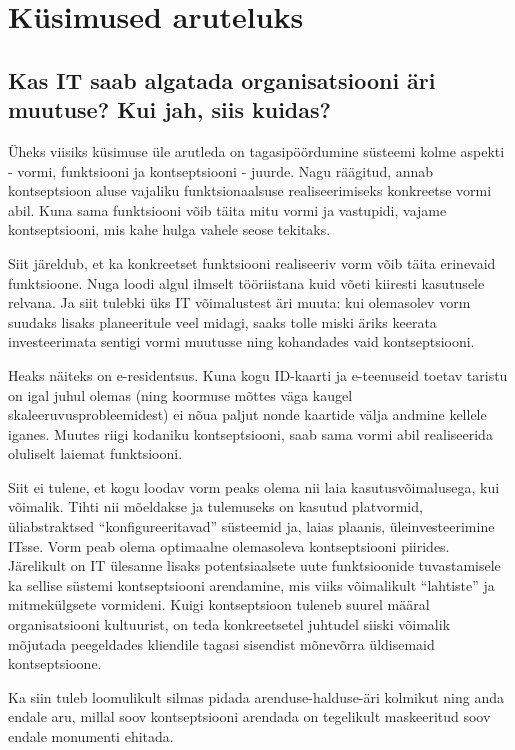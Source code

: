 \documentclass{tufte-book}
\begin{document}
\section{Küsimused aruteluks}
\subsection{Kas IT saab algatada organisatsiooni äri muutuse? Kui jah, siis kuidas?}
Üheks viisiks küsimuse üle arutleda on tagasipöördumine süsteemi kolme aspekti - vormi, funktsiooni ja kontseptsiooni - juurde. Nagu räägitud, annab kontseptsioon aluse vajaliku funktsionaalsuse realiseerimiseks konkreetse vormi abil. Kuna sama funktsiooni võib täita mitu vormi ja vastupidi, vajame kontseptsiooni, mis kahe hulga vahele seose tekitaks. 

Siit järeldub, et ka konkreetset funktsiooni realiseeriv vorm võib täita erinevaid funktsioone. Nuga loodi algul ilmselt tööriistana kuid võeti kiiresti kasutusele relvana. Ja siit tulebki üks IT võimalustest äri muuta: kui olemasolev vorm suudaks lisaks planeeritule veel midagi, saaks tolle miski äriks keerata investeerimata sentigi vormi muutusse ning kohandades vaid kontseptsiooni. 

Heaks näiteks on e-residentsus. Kuna kogu ID-kaarti ja e-teenuseid toetav taristu on igal juhul olemas (ning koormuse mõttes väga kaugel skaleeruvusprobleemidest) ei nõua paljut nonde kaartide välja andmine kellele iganes. Muutes riigi kodaniku kontseptsiooni, saab sama vormi abil realiseerida oluliselt laiemat funktsiooni. 

Siit ei tulene, et kogu loodav vorm peaks olema nii laia kasutusvõimalusega, kui võimalik. Tihti nii mõeldakse ja tulemuseks on kasutud platvormid, üliabstraktsed \enquote{konfigureeritavad} süsteemid ja, laias plaanis, üleinvesteerimine ITsse. Vorm peab olema optimaalne olemasoleva kontseptsiooni piirides. Järelikult on IT ülesanne lisaks potentsiaalsete uute funktsioonide tuvastamisele ka sellise süstemi kontseptsiooni arendamine, mis viiks võimalikult \enquote{lahtiste} ja mitmekülgsete vormideni. Kuigi kontseptsioon tuleneb suurel määral organisatsiooni kultuurist, on teda konkreetsetel juhtudel siiski võimalik mõjutada peegeldades kliendile tagasi sisendist mõnevõrra üldisemaid kontseptsioone. 

Ka siin tuleb loomulikult silmas pidada arenduse-halduse-äri kolmikut ning anda endale aru, millal soov kontseptsiooni arendada on tegelikult maskeeritud soov endale monumenti ehitada.
\end{document}
